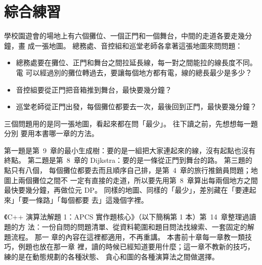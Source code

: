\chapter{綜合練習}
\label{ch:capstone}


學校園遊會的場地上有六個攤位、一個正門和一個舞台，中間的走道各要走幾分鐘，畫
成一張地圖。 總務處、音控組和巡堂老師各拿著這張地圖來問問題：

\begin{itemize}
\item 總務處要在攤位、正門和舞台之間拉延長線，每一對之間能拉的線長度不同。 電
可以經過別的攤位轉過去，要讓每個地方都有電，線的總長最少是多少？
\item 音控組要從正門把音箱推到舞台，最快要幾分鐘？
\item 巡堂老師從正門出發，每個攤位都要去一次，最後回到正門，最快要幾分鐘？
\end{itemize}

三個問題用的是同一張地圖，看起來都在問「最少」。 往下讀之前，先想想每一題分別
要用本書哪一章的方法。

第一題是第~9~章的最小生成樹：要的是一組把大家連起來的線，沒有起點也沒有終點。
第二題是第~8~章的 Dijkstra：要的是一條從正門到舞台的路。 第三題的點只有八個，
每個攤位都要去而且順序自己排，是第~4~章的旅行推銷員問題；地圖上兩個攤位之間不
一定有直接的走道，所以要先用第~8~章算出每兩個地方之間最快要幾分鐘，再做位元
DP。 同樣的地圖、同樣的「最少」，差別藏在「要連起來」「要一條路」「每個都要
去」這幾個字裡。

《C++ 演算法解題 1：APCS 實作題核心》（以下簡稱第 1 本）第~14~章整理過讀題的方
法：一份自問的問題清單、從資料範圍和題目問法找線索、一套固定的解題流程。 那一
章的內容在這裡都適用，不再重講。 本書前十章每一章教一類技巧，例題也放在那一章
裡，讀的時候已經知道要用什麼；這一章不教新的技巧，練的是在動態規劃的各種狀態、
貪心和圖的各種演算法之間做選擇。

